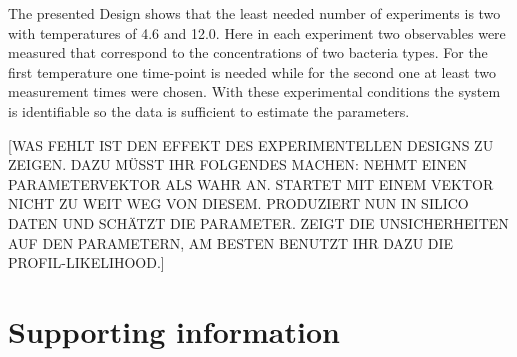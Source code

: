 \documentclass[10pt,A4paper]{article}
\begin{document}
The presented Design shows that the least needed number of experiments is two with temperatures of 4.6 and 12.0.
Here in each experiment two observables were measured that correspond to the concentrations of two bacteria types.
For the first temperature one time-point is needed while for the second one at least two measurement times were chosen.
With these experimental conditions the system is identifiable so the data is sufficient to estimate the parameters.

[WAS FEHLT IST DEN EFFEKT DES EXPERIMENTELLEN DESIGNS ZU ZEIGEN. DAZU MÜSST IHR FOLGENDES MACHEN: NEHMT EINEN PARAMETERVEKTOR ALS WAHR AN. STARTET MIT EINEM VEKTOR NICHT ZU WEIT WEG VON DIESEM. PRODUZIERT NUN IN SILICO DATEN UND SCHÄTZT DIE PARAMETER. ZEIGT DIE UNSICHERHEITEN AUF DEN PARAMETERN, AM BESTEN BENUTZT IHR DAZU DIE PROFIL-LIKELIHOOD.]
%
%
%
\section*{Supporting information}
%
%
%
\nolinenumbers

\end{document}
